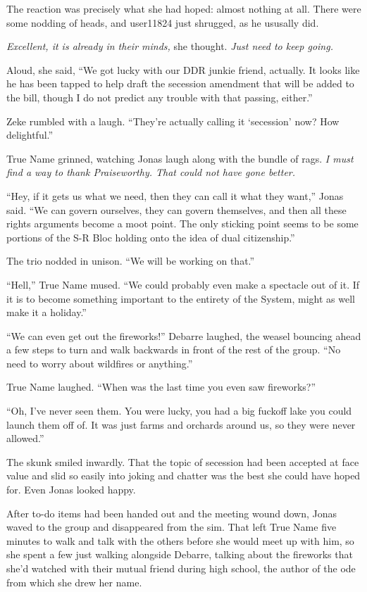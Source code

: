 The reaction was precisely what she had hoped: almost nothing at all. There were some nodding of heads, and user11824 just shrugged, as he ususally did.

\emph{Excellent, it is already in their minds,} she thought. \emph{Just need to keep going.}

Aloud, she said, ``We got lucky with our DDR junkie friend, actually. It looks like he has been tapped to help draft the secession amendment that will be added to the bill, though I do not predict any trouble with that passing, either.''

Zeke rumbled with a laugh. ``They're actually calling it `secession' now? How delightful.''

True Name grinned, watching Jonas laugh along with the bundle of rags. \emph{I must find a way to thank Praiseworthy. That could not have gone better.}

``Hey, if it gets us what we need, then they can call it what they want,'' Jonas said. ``We can govern ourselves, they can govern themselves, and then all these rights arguments become a moot point. The only sticking point seems to be some portions of the S-R Bloc holding onto the idea of dual citizenship.''

The trio nodded in unison. ``We will be working on that.''

``Hell,'' True Name mused. ``We could probably even make a spectacle out of it. If it is to become something important to the entirety of the System, might as well make it a holiday.''

``We can even get out the fireworks!'' Debarre laughed, the weasel bouncing ahead a few steps to turn and walk backwards in front of the rest of the group. ``No need to worry about wildfires or anything.''

True Name laughed. ``When was the last time you even saw fireworks?''

``Oh, I've never seen them. You were lucky, you had a big fuckoff lake you could launch them off of. It was just farms and orchards around us, so they were never allowed.''

The skunk smiled inwardly. That the topic of secession had been accepted at face value and slid so easily into joking and chatter was the best she could have hoped for. Even Jonas looked happy.

After to-do items had been handed out and the meeting wound down, Jonas waved to the group and disappeared from the sim. That left True Name five minutes to walk and talk with the others before she would meet up with him, so she spent a few just walking alongside Debarre, talking about the fireworks that she'd watched with their mutual friend during high school, the author of the ode from which she drew her name.

